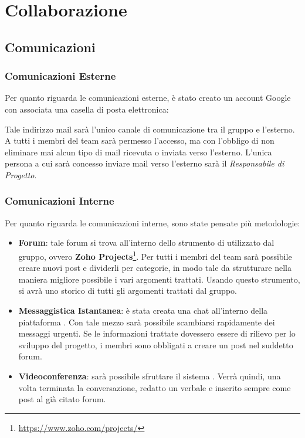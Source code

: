 \section{Collaborazione}
\subsection{Comunicazioni}
\subsubsection{Comunicazioni Esterne}

Per quanto riguarda le comunicazioni esterne, è stato creato un account Google con associata una casella di posta elettronica: 
\begin{center}
\GroupEmail
\end{center}
Tale indirizzo mail sarà l'unico canale di comunicazione tra il gruppo e l'esterno. A tutti i membri del team sarà permesso l'accesso, ma con l'obbligo di non eliminare mai alcun tipo di mail ricevuta o inviata verso l'esterno. L'unica persona a cui sarà concesso inviare mail verso l'esterno sarà il \textit{Responsabile di Progetto}.

\subsubsection{Comunicazioni Interne}

Per quanto riguarda le comunicazioni interne, sono state pensate più metodologie:

\begin{itemize}
\item \textbf{Forum}: tale forum si trova all'interno dello strumento di  utilizzato dal gruppo, ovvero \textbf{Zoho Projects}\footnote[1]{\url{https://www.zoho.com/projects/}}. Per tutti i membri del team sarà possibile creare nuovi post e dividerli per categorie, in modo tale da strutturare nella maniera migliore possibile i vari argomenti trattati. Usando questo strumento, si avrà uno storico di tutti gli argomenti trattati dal gruppo.
\item \textbf{Messaggistica Istantanea}: è stata creata una chat all'interno della piattaforma . Con tale mezzo sarà possibile scambiarsi rapidamente dei messaggi urgenti. Se le informazioni trattate dovessero essere di rilievo per lo sviluppo del progetto, i membri sono obbligati a creare un post nel suddetto forum.
\item \textbf{Videoconferenza}: sarà possibile sfruttare il sistema . Verrà quindi, una volta terminata la conversazione, redatto un verbale e inserito sempre come post al già citato forum.
\end{itemize}

